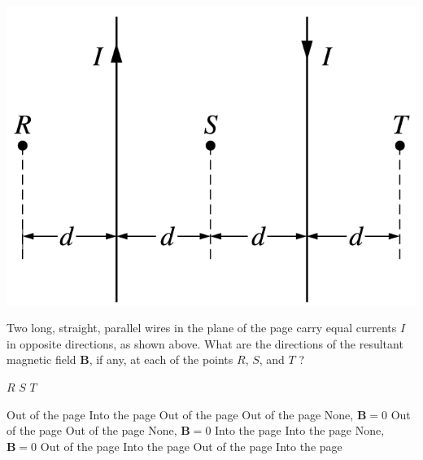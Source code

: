 \begin{center}
\includegraphics[scale=0.25]{images/img-005-005.png}
\end{center}

\begin{questions}\setcounter{question}{7}\question
Two long, straight, parallel wires in the plane of the page carry equal currents $I$ in opposite directions, as shown above. What are the directions of the resultant magnetic field $\mathbf{B}$, if any, at each of the points $R$, $S$, and $T$ ?

\tabto{0.75cm} \underline{$R$}
\tabto{5.00cm} \underline{$S$}
\tabto{9.25cm} \underline{$T$}

\begin{choices}
\choice Out of the page  \tabto{4.25cm} Into the page        \tabto{8.50cm} Out of the page
\choice Out of the page  \tabto{4.25cm} None, $\mathbf{B}=0$ \tabto{8.50cm} Out of the page
\choice Out of the page  \tabto{4.25cm} None, $\mathbf{B}=0$ \tabto{8.50cm} Into the page
\choice Into the page    \tabto{4.25cm} None, $\mathbf{B}=0$ \tabto{8.50cm} Out of the page
\choice Into the page    \tabto{4.25cm} Out of the page      \tabto{8.50cm} Into the page
\end{choices}\end{questions}

